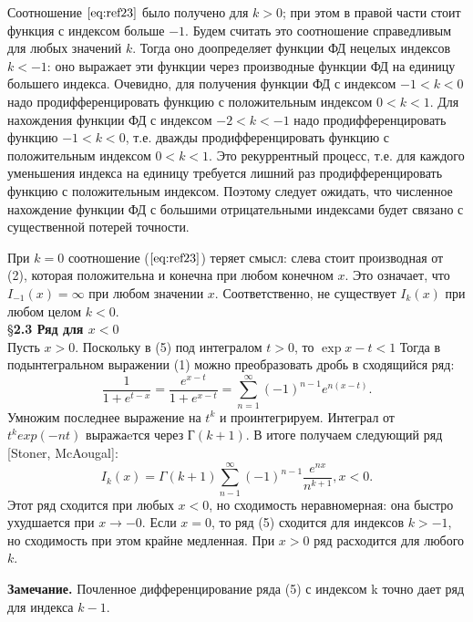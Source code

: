 Соотношение $\ref{eq:ref23}$ было получено для $k > 0$; при этом в правой части стоит
функция с индексом больше $-1$. Будем считать это соотношение справедливым
для любых значений $k$. Тогда оно доопределяет функции ФД нецелых индексов
$k < -1$: оно выражает эти функции через производные функции ФД на единицу
большего индекса. Очевидно, для получения функции ФД с индексом $-1 < k < 0$
надо продифференцировать функцию с положительным индексом $0 < k < 1$. Для
нахождения функции ФД с индексом $-2 < k < -1$ надо продифференцировать
функцию $-1< k < 0$, т.е. дважды продифференцировать функцию с
положительным индексом $0 < k < 1$. Это рекуррентный процесс, т.е. для
каждого уменьшения индекса на единицу требуется лишний раз
продифференцировать функцию с положительным индексом. Поэтому следует
ожидать, что численное нахождение функции ФД с большими отрицательными
индексами будет связано с существенной потерей точности.

При $k = 0$ соотношение ($\ref{eq:ref23}$) теряет смысл: слева стоит производная от (2),
которая положительна и конечна при любом конечном $x$. Это означает, что
$I_{-1}(x) = \infty$ при любом значении $x$. Соответственно, не существует $I_k(x)$ при
любом целом $k < 0$.
\\

\S \textbf{2.3 Ряд для $x < 0$}
\\

Пусть $x > 0$. Поскольку в (5) под интегралом $t > 0$, то $\exp{x-t} < 1$ Тогда в
подынтегральном выражении (1) можно преобразовать дробь в сходящийся
ряд:
\begin{equation}
\frac{1}{1+e^{t-x}} = \frac{e^{x-t}}{1+e^{x-t}}=\sum\limits_{n=1}^{\infty} (-1)^{n-1}e^{n(x-t)}.
\end{equation}
Умножим последнее выражение на $t^k$ и проинтегрируем. Интеграл от
$t^{k}exp(-nt)$ выражаeтся через $Г(k + 1)$. В итоге получаем следующий ряд [Stoner, McAougal]:
\begin{equation}
I_k(x)=\Gamma(k+1)\sum\limits_{n-1}^{\infty} (-1)^{n-1}\frac{e^{nx}}{n^{k+1}},x<0.
\end{equation}
Этот ряд сходится при любых $x < 0$, но сходимость неравномерная: она быстро
ухудшается при $x \to -0$. Если $x = 0$, то ряд (5) сходится для индексов $k > -1$, но
сходимость при этом крайне медленная. При $x > 0$ ряд расходится для любого
$k$.

\textbf{Замечание.} Почленное дифференцирование ряда (5) с индексом k точно
дает ряд для индекса $k - 1$.
\\

